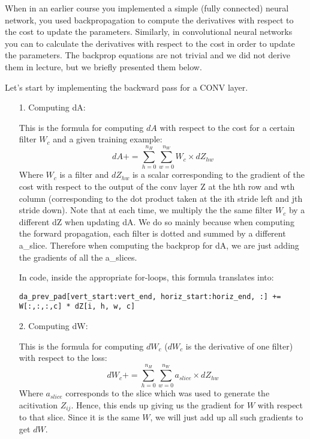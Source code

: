 {When in an earlier course you implemented a simple (fully connected) neural network, you used backpropagation to compute the derivatives with respect to the cost to update the parameters. Similarly, in convolutional neural networks you can to calculate the derivatives with respect to the cost in order to update the parameters. The backprop equations are not trivial and we did not derive them in lecture, but we briefly presented them below.


Let's start by implementing the backward pass for a CONV layer.
\begin{itemize}
\item[1.] Computing dA:

This is the formula for computing $dA$ with respect to the cost for a certain filter $W_c$ and a given training example:
\begin{equation}\label{dA}
dA += \sum _{h=0} ^{n_H} \sum_{w=0} ^{n_W} W_c \times dZ_{hw}
\end{equation}
Where $W_c$ is a filter and $dZ_{hw}$ is a scalar corresponding to the gradient of the cost with respect to the output of the conv layer Z at the hth row and wth column (corresponding to the dot product taken at the ith stride left and jth stride down). Note that at each time, we multiply the the same filter $W_c$ by a different dZ when updating dA. We do so mainly because when computing the forward propagation, each filter is dotted and summed by a different a\_slice. Therefore when computing the backprop for dA, we are just adding the gradients of all the a\_slices. 

In code, inside the appropriate for-loops, this formula translates into:
\begin{verbatim}
da_prev_pad[vert_start:vert_end, horiz_start:horiz_end, :] += W[:,:,:,c] * dZ[i, h, w, c]
\end{verbatim}

\item[2.] Computing dW:

This is the formula for computing $dW_c$ ($dW_c$ is the derivative of one filter) with respect to the loss:
\begin{equation}\label{dW}
dW_c  += \sum _{h=0} ^{n_H} \sum_{w=0} ^ {n_W} a_{slice} \times dZ_{hw}
\end{equation}
Where $a_{slice}$ corresponds to the slice which was used to generate the acitivation $Z_{ij}$. Hence, this ends up giving us the gradient for $W$ with respect to that slice. Since it is the same $W$, we will just add up all such gradients to get $dW$. 


\end{itemize}}
